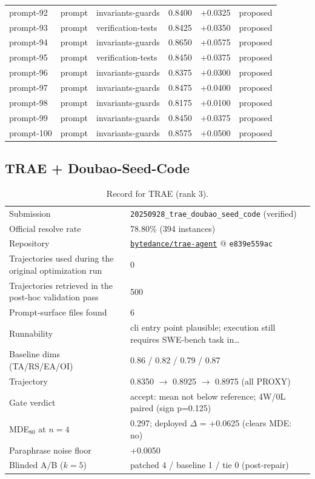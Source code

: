 \begin{center}
\begin{longtable}{llp{5.2cm}rrl}
prompt-92 & prompt & invariants-guards & 0.8400 & +0.0325 & proposed \\
prompt-93 & prompt & verification-tests & 0.8425 & +0.0350 & proposed \\
prompt-94 & prompt & invariants-guards & 0.8650 & +0.0575 & proposed \\
prompt-95 & prompt & verification-tests & 0.8450 & +0.0375 & proposed \\
prompt-96 & prompt & invariants-guards & 0.8375 & +0.0300 & proposed \\
prompt-97 & prompt & invariants-guards & 0.8475 & +0.0400 & proposed \\
prompt-98 & prompt & invariants-guards & 0.8175 & +0.0100 & proposed \\
prompt-99 & prompt & invariants-guards & 0.8450 & +0.0375 & proposed \\
prompt-100 & prompt & invariants-guards & 0.8575 & +0.0500 & proposed \\
\bottomrule\end{longtable}\end{center}
\clearpage
\subsection{TRAE + Doubao-Seed-Code}
\label{app:agent3}
\begin{table}[h]\centering\scriptsize
\caption{Record for TRAE (rank 3).}
\begin{tabular}{lp{8.2cm}}\toprule
Submission & \texttt{20250928\_\allowbreak{}trae\_\allowbreak{}doubao\_\allowbreak{}seed\_\allowbreak{}code} (verified) \\
Official resolve rate & 78.80\% (394 instances) \\
Repository & \href{https://github.com/bytedance/trae-agent}{\texttt{bytedance/trae-agent}} @ \texttt{e839e559ac} \\
Trajectories used during the original optimization run & 0 \\
Trajectories retrieved in the post-hoc validation pass & 500 \\
Prompt-surface files found & 6 \\
Runnability & cli entry point plausible; execution still requires SWE-bench task in\ldots{} \\
Baseline dims (TA/RS/EA/OI) & 0.86 / 0.82 / 0.79 / 0.87 \\
Trajectory & 0.8350 $\to$ 0.8925 $\to$ 0.8975 (all PROXY) \\
Gate verdict & accept: mean not below reference; 4W/0L paired (sign p=0.125) \\
MDE$_{80}$ at $n{=}4$ & 0.297; deployed $\Delta$ = +0.0625 (clears MDE: no) \\
Paraphrase noise floor & +0.0050 \\
Blinded A/B ($k{=}5$) & patched 4 / baseline 1 / tie 0 (post-repair) \\
\bottomrule\end{tabular}\end{table}
